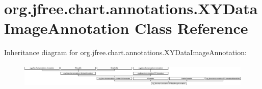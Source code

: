 \hypertarget{classorg_1_1jfree_1_1chart_1_1annotations_1_1_x_y_data_image_annotation}{}\section{org.\+jfree.\+chart.\+annotations.\+X\+Y\+Data\+Image\+Annotation Class Reference}
\label{classorg_1_1jfree_1_1chart_1_1annotations_1_1_x_y_data_image_annotation}
Inheritance diagram for org.\+jfree.\+chart.\+annotations.\+X\+Y\+Data\+Image\+Annotation\+:\begin{figure}[H]
\begin{center}
\leavevmode
\includegraphics[height=1.185185cm]{classorg_1_1jfree_1_1chart_1_1annotations_1_1_x_y_data_image_annotation}
\end{center}
\end{figure}
